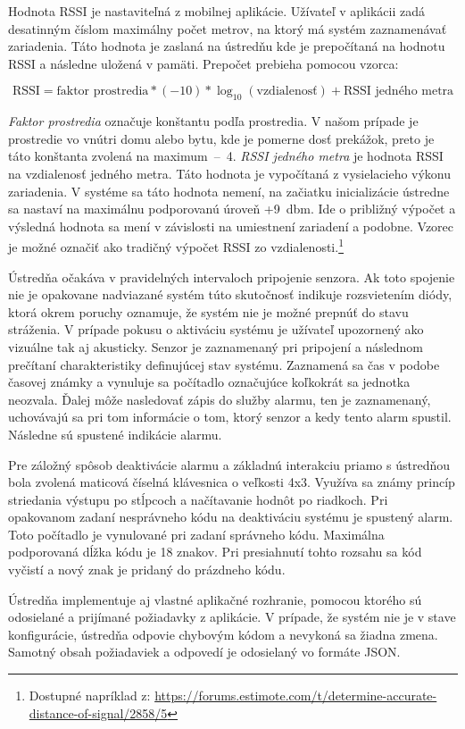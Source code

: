 Hodnota RSSI je nastaviteľná z mobilnej aplikácie. Užívateľ v aplikácii zadá desatinným číslom maximálny počet metrov, na ktorý má systém zaznamenávať zariadenia. Táto hodnota je zaslaná na ústredňu kde je prepočítaná na hodnotu RSSI a následne uložená v pamäti. Prepočet prebieha pomocou vzorca:

$$\text{RSSI} = \text{faktor prostredia} * (- 10) * \log_{10}(\text{vzdialenosť}) + \text{RSSI jedného metra}$$

\textit{Faktor prostredia} označuje konštantu podľa prostredia. V našom prípade je prostredie vo vnútri domu alebo bytu, kde je pomerne dosť prekážok, preto je táto konštanta zvolená na maximum~--~4. \textit{RSSI jedného metra} je hodnota RSSI na vzdialenosť jedného metra. Táto hodnota je vypočítaná z vysielacieho výkonu zariadenia. V systéme sa táto hodnota nemení, na začiatku inicializácie ústredne sa nastaví na maximálnu podporovanú úroveň +9~dbm. Ide o približný výpočet a výsledná hodnota sa mení v závislosti na umiestnení zariadení a podobne. Vzorec je možné označiť ako tradičný výpočet RSSI zo vzdialenosti.\footnote{Dostupné napríklad z: \url{https://forums.estimote.com/t/determine-accurate-distance-of-signal/2858/5}}

Ústredňa očakáva v pravidelných intervaloch pripojenie senzora. Ak toto spojenie nie je opakovane nadviazané systém túto skutočnosť indikuje rozsvietením diódy, ktorá okrem poruchy oznamuje, že systém nie je možné prepnúť do stavu stráženia. V prípade pokusu o aktiváciu systému je užívateľ upozornený ako vizuálne tak aj akusticky. Senzor je zaznamenaný pri pripojení a následnom prečítaní charakteristiky definujúcej stav systému. Zaznamená sa čas v podobe časovej známky a vynuluje sa počítadlo označujúce koľkokrát sa jednotka neozvala. Ďalej môže nasledovať zápis do služby alarmu, ten je zaznamenaný, uchovávajú sa pri tom informácie o tom, ktorý senzor a kedy tento alarm spustil. Následne sú spustené indikácie alarmu.

Pre záložný spôsob deaktivácie alarmu a základnú interakciu priamo s ústredňou bola zvolená maticová číselná klávesnica o veľkosti 4x3. Využíva sa známy princíp striedania výstupu po stĺpcoch a načítavanie hodnôt po riadkoch. Pri opakovanom zadaní nesprávneho kódu na deaktiváciu systému je spustený alarm. Toto počítadlo je vynulované pri zadaní správneho kódu. Maximálna podporovaná dĺžka kódu je 18 znakov. Pri presiahnutí tohto rozsahu sa kód vyčistí a nový znak je pridaný do prázdneho kódu.

Ústredňa implementuje aj vlastné aplikačné rozhranie, pomocou ktorého sú odosielané a prijímané požiadavky z aplikácie. V prípade, že systém nie je v stave konfigurácie, ústredňa odpovie chybovým kódom a nevykoná sa žiadna zmena. Samotný obsah požiadaviek a odpovedí je odosielaný vo formáte JSON.


